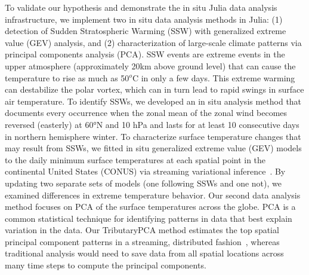 \documentclass{juliacon}
\begin{document}
To validate our hypothesis and demonstrate the in situ Julia data analysis infrastructure, we implement two in situ data analysis methods in Julia: (1) detection of Sudden Stratospheric Warming (SSW) with generalized extreme value (GEV) analysis, and (2) characterization of large-scale climate patterns via principal components analysis (PCA). SSW events are extreme events in the upper atmosphere (approximately 20km above ground level) that can cause the temperature to rise as much as 50$^o$C in only a few days.  This extreme warming can destabilize the polar vortex, which can in turn lead to rapid swings in surface air temperature. To identify SSWs, we developed an in situ analysis method that documents every occurrence when the zonal mean of the zonal wind becomes reversed (easterly) at 60°N and 10 hPa and lasts for at least 10 consecutive days in northern hemisphere winter. To characterize surface temperature changes that may result from SSWs, we fitted in situ generalized extreme value (GEV) models to the daily minimum surface temperatures at each spatial point in the continental United States (CONUS) via streaming variational inference~\cite{broderick2013streaming}. By updating two separate sets of models (one following SSWs and one not), we examined differences in extreme temperature behavior. Our second data analysis method focuses on PCA of the surface temperatures across the globe. PCA is a common statistical technique for identifying patterns in data that best explain variation in the data. Our TributaryPCA method estimates the top spatial principal component patterns in a streaming, distributed fashion~\cite{wang2021tributarypca}, whereas traditional analysis would need to save data from all spatial locations across many time steps to compute the principal components.
\end{document}
